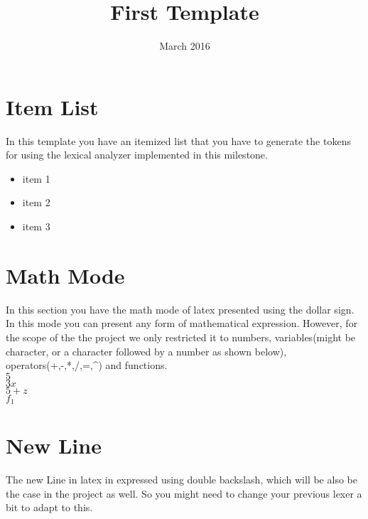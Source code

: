 \documentclass{article}
\begin{document}
\title{First Template}
\date{March 2016}
\maketitle


\section{Item List}
In this template you have an itemized list that you have to generate the tokens for using the lexical analyzer implemented in this milestone. \\

\begin{itemize}
\item item 1
\item item 2
\item item 3
\end{itemize}

\section{Math Mode}
In this section you have the math mode of latex presented using the dollar sign. In this mode you can present any form of mathematical expression. However, for the scope of the the project we only restricted it to numbers, variables(might be character, or a character followed by a number as shown below), operators(+,-,*,/,=,^) and functions. \\

$5$
\\
$3x$
\\
$5+z$
\\
$f_1$

\section{New Line}
The new Line in latex in expressed using double backslash, which will be also be the case in the project as well. So you might need to change your previous lexer a bit to adapt to this.
\end{document}
